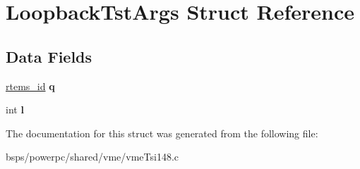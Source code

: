 \hypertarget{structLoopbackTstArgs}{}\section{Loopback\+Tst\+Args Struct Reference}
\label{structLoopbackTstArgs}
\subsection*{Data Fields}
\begin{DoxyCompactItemize}
\item 
\mbox{\label{structLoopbackTstArgs_a963a280eb3330ff73b4c76258fa3b60d}} 
\mbox{\hyperlink{group__ClassicTasks_gab20892b814dced7dd4e5b9bf42becd57}{rtems\+\_\+id}} {\bfseries q}
\item 
\mbox{\label{structLoopbackTstArgs_a53da1735fe0ae22887cd2e2d108c3c2b}} 
int {\bfseries l}
\end{DoxyCompactItemize}


The documentation for this struct was generated from the following file\+:\begin{DoxyCompactItemize}
\item 
bsps/powerpc/shared/vme/vme\+Tsi148.\+c\end{DoxyCompactItemize}
